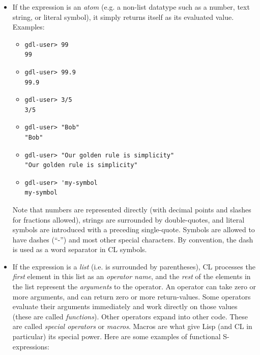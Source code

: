 \documentclass [11pt]{book}
\begin{document}
\begin{itemize}

\item If the expression is an \emph{atom} (e.g. a non-list datatype such as a number, text
string, or literal symbol), it simply returns itself as its evaluated
value. Examples: 

\begin{itemize}

\item 

\begin{verbatim}gdl-user> 99
99
\end{verbatim}

\item 

\begin{verbatim}gdl-user> 99.9
99.9
\end{verbatim}

\item 

\begin{verbatim}gdl-user> 3/5
3/5
\end{verbatim}

\item 

\begin{verbatim}gdl-user> "Bob"
"Bob"
\end{verbatim}

\item 

\begin{verbatim}gdl-user> "Our golden rule is simplicity"
"Our golden rule is simplicity"
\end{verbatim}

\item 

\begin{verbatim}gdl-user> 'my-symbol
my-symbol
\end{verbatim}

\end{itemize}

Note that numbers are represented directly (with decimal
points and slashes for fractions allowed), strings are surrounded by
double-quotes, and literal symbols are introduced with a preceding
single-quote. Symbols are allowed to have dashes (``-'') and most
other special characters. By convention, the dash is used as a word
separator in CL symbols.

\item If the expression is a \emph{list} (i.e. is surrounded by parentheses), CL processes
the \emph{first} element in this list as an \emph{operator name}, and the \emph{rest} of the elements in the list represent the \emph{arguments} to the operator. An operator can take zero or more
arguments, and can return zero or more return-values. Some operators
evaluate their arguments immediately and work directly on those
values (these are called \emph{functions}). Other operators expand into other code. These are called \emph{special operators} or \emph{macros}. Macros are what give Lisp (and CL in particular) its
special power. Here are some examples of functional S-expressions: 


\end{itemize}
\end{document}
